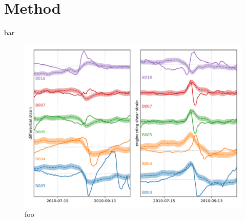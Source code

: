 \documentclass[10pt,a4paper]{article}
\begin{document}
\section{Method}\label{sec:Method}
bar
\begin{figure}
\includegraphics[scale=0.8]{figures/Figure_1}
\caption{foo}   
\label{fig:Demo1}
\end{figure}


  
 
\end{document}
